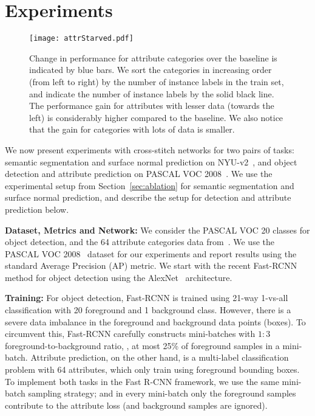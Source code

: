 \documentclass[10pt,twocolumn,letterpaper]{article}
\begin{document}
 
\section{Experiments}
\label{sec:experiments}
\begin{figure*}[!ht]
\centering
\texttt{[image: attrStarved.pdf]}
\caption{Change in performance for attribute categories over the baseline is indicated by blue bars. We sort the categories in increasing order (from left to right) by the number of instance labels in the train set, and indicate the number of instance labels by the solid black line. The performance gain for attributes with lesser data (towards the left) is considerably higher compared to the baseline. We also notice that the gain for categories with lots of data is smaller.}
\vspace{-0.2in}
\label{fig:attr-starved-gain}
\end{figure*}
We now present experiments with cross-stitch networks for two pairs of tasks: semantic segmentation and surface normal prediction on NYU-v2~\cite{nyuv2}, and object detection and attribute prediction on PASCAL VOC 2008~\cite{pascal,apascal}. We use the experimental setup from Section~\ref{sec:ablation} for semantic segmentation and surface normal prediction, and describe the setup for detection and attribute prediction below.

\par \noindent \textbf{Dataset, Metrics and Network:} We consider the PASCAL VOC 20 classes for object detection, and the 64 attribute categories data from~\cite{apascal}. We use the PASCAL VOC 2008~\cite{pascal,apascal} dataset for our experiments and report results using the standard Average Precision (AP) metric. We start with the recent Fast-RCNN~\cite{fast-rcnn} method for object detection using the AlexNet~\cite{alexnet} architecture.

\par \noindent \textbf{Training:} For object detection, Fast-RCNN is trained using 21-way 1-vs-all classification with 20 foreground and 1 background class. However, there is a severe data imbalance in the foreground and background data points (boxes). To circumvent this, Fast-RCNN carefully constructs mini-batches with $1:3$ foreground-to-background ratio, \ie, at most 25\% of foreground samples in a mini-batch. Attribute prediction, on the other hand, is a multi-label classification problem with 64 attributes, which only train using foreground bounding boxes. To implement both tasks in the Fast R-CNN framework, we use the same mini-batch sampling strategy; and in every mini-batch only the foreground samples contribute to the attribute loss (and background samples are ignored).
\end{document}
